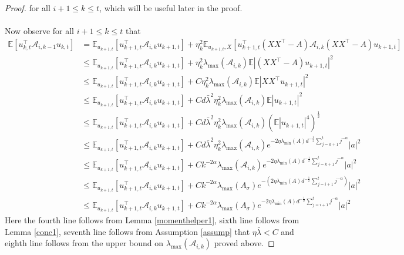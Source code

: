 \documentclass[11pt, reqno,english]{amsart}
\begin{document}
\begin{proof}
for all $i+1 \leq k \leq t$, which will be useful later in the proof.
\\\\
Now observe for all $i + 1 \leq k \leq t$ that
\begin{align*}
\mathbb{E}[u_{k,t}^\top \mathcal A_{i,k-1} u_{k,t}] &= \mathbb{E}_{u_{k+1, t}}[u_{k+1, t}^\top \mathcal A_{i,k} u_{k+1,t}] + \eta_k^2\mathbb{E}_{u_{k+1,t}, X}[u_{k+1,t}^\top (XX^\top - A) \mathcal A_{i,k}(XX^\top - A)u_{k+1,t}]
\\
&\leq \mathbb{E}_{u_{k+1,t}}[u_{k+1, t}^\top \mathcal A_{i,k} u_{k+1, t}] + \eta_k^2 \lambda_{\max}(\mathcal A_{i,k}) \mathbb{E}|(XX^\top - A)u_{k+1, t}|^2
\\
&\leq \mathbb{E}_{u_{k+1, t}}[u_{k+1, t}^\top \mathcal A_{i,k} u_{k+1, t}] + C\eta_k^2 \lambda_{\max}(\mathcal A_{i,k}) \mathbb{E}|XX^\top u_{k+1, t} |^2
\\
&\leq \mathbb{E}_{u_{k+1, t}}[u_{k+1, t}^\top \mathcal A_{i,k} u_{k+1, t}] + Cd\bar{\lambda}^2\eta_k^2 \lambda_{\max}(\mathcal A_{i,k})  \mathbb{E}|u_{k+1, t}|^2
\\
&\leq \mathbb{E}_{u_{k+1, t}}[u_{k+1, t}^\top \mathcal A_{i,k} u_{k+1,t}] + Cd\bar{\lambda}^2\eta_k^2 \lambda_{\max}(\mathcal A_{i,k})(\mathbb{E}|u_{k+1, t}|^4)^{\frac{1}{2}}
\\
&\leq \mathbb{E}_{u_{k+1,t}}[u_{k+1,t}^\top \mathcal A_{i,k} u_{k+1,t}] + Cd\bar{\lambda}^2\eta_k^2 \lambda_{\max}(\mathcal A_{i,k}) e^{-2\eta \lambda_{\min}(A)d^{-\frac{1}{2}}\sum_{j = k+1}^{t}j^{-\alpha}}|a|^2
\\
&\leq \mathbb{E}_{u_{k+1,t}}[u_{k+1,t}^\top \mathcal A_{i,k} u_{k+1,t}] + Ck^{-2\alpha}\lambda_{\max}(\mathcal A_{i,k}) e^{-2\eta \lambda_{\min}(A)d^{-\frac{1}{2}}\sum_{j = k+1}^{t}j^{-\alpha}}|a|^2
\\
&\leq \mathbb{E}_{u_{k+1, t}}[u_{k+1,t}^\top \mathcal A_{i,k} u_{k+1,t}] + Ck^{-2\alpha}\lambda_{\max}(A_{\sigma}) e^{-(2\eta \lambda_{\min}(A)d^{-\frac{1}{2}}\sum_{j = i+1}^t j^{-\alpha})}  |a|^2
\\
&\leq \mathbb{E}_{u_{k+1,t}}[u_{k+1,t}^\top \mathcal A_{i,k} u_{k+1,t}] + Ck^{-2\alpha}\lambda_{\max}(A_{\sigma}) e^{-2\eta \lambda_{\min}(A)d^{-\frac{1}{2}}\sum_{j = i+1}^t j^{-\alpha}}  |a|^2
\end{align*}
Here the fourth line follows from Lemma \ref{momenthelper1}, sixth line follows from Lemma \ref{conc1}, seventh line follows from Assumption \ref{assump} that $\eta \bar{\lambda} < C$ and eighth line follows from the upper bound on $\lambda_{\max}(\mathcal A_{i,k})$ proved above. 

\end{proof}
\end{document}
